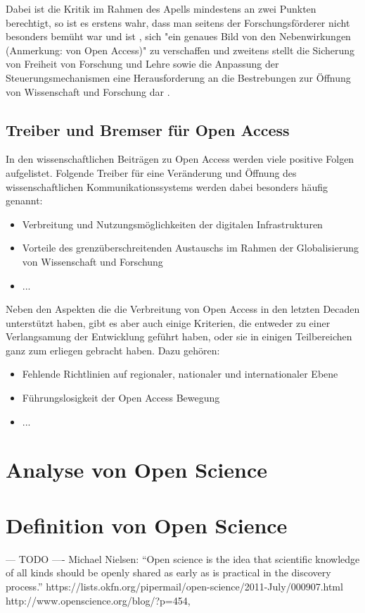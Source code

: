 Dabei ist die Kritik im Rahmen des Apells mindestens an zwei Punkten berechtigt, so ist es erstens wahr, dass man seitens der Forschungsförderer nicht besonders bemüht war und ist \cite{suchen}, sich "ein genaues Bild von den Nebenwirkungen (Anmerkung: von Open Access)" \cite{Reuss_2009} zu verschaffen und zweitens stellt die Sicherung von Freiheit von Forschung und Lehre sowie die Anpassung der Steuerungsmechanismen eine Herausforderung an die Bestrebungen zur Öffnung von Wissenschaft und Forschung dar \cite{suchen}.

\subsection{Treiber und Bremser für Open Access} 

In den wissenschaftlichen Beiträgen zu Open Access werden viele positive Folgen aufgelistet. Folgende Treiber für eine Veränderung und Öffnung des wissenschaftlichen Kommunikationssystems werden dabei besonders häufig genannt:

\begin{itemize}
\item Verbreitung und Nutzungsmöglichkeiten der digitalen Infrastrukturen
\item Vorteile des grenzüberschreitenden Austauschs im Rahmen der Globalisierung von Wissenschaft und Forschung
\item ...
\end{itemize}

Neben den Aspekten die die Verbreitung von Open Access in den letzten Decaden unterstützt haben, gibt es aber auch einige Kriterien, die entweder zu einer Verlangsamung der Entwicklung geführt haben, oder sie in einigen Teilbereichen ganz zum erliegen gebracht haben. Dazu gehören:

\begin{itemize}
\item Fehlende Richtlinien auf regionaler, nationaler und internationaler Ebene
\item Führungslosigkeit der Open Access Bewegung
\item ...
\end{itemize}

\section{Analyse von Open Science} 


\section{Definition von Open Science} 
--- TODO ---- Michael Nielsen: “Open science is the idea that scientific knowledge of all kinds should be openly shared as early as is practical in the discovery process.”  https://lists.okfn.org/pipermail/open-science/2011-July/000907.html
http://www.openscience.org/blog/?p=454,

